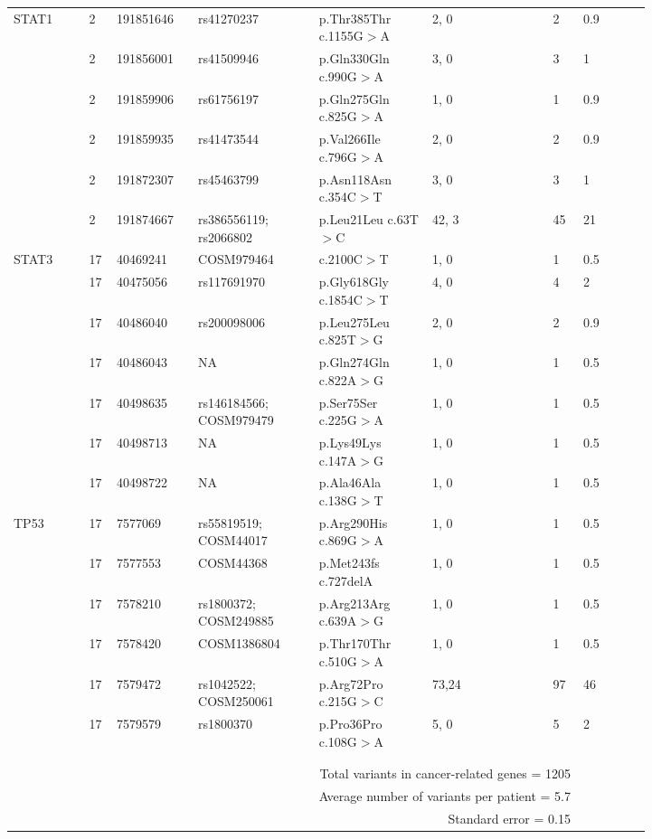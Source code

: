 \begin{longtable}{p{0.1\linewidth}|p{0.02\linewidth}p{0.1\linewidth}p{0.16\linewidth}p{0.15\linewidth}p{0.16\linewidth}p{0.04\linewidth}p{0.09\linewidth}}
		\hline
		STAT1 & 2 & 191851646 & rs41270237 & p.Thr385Thr c.1155G$>$A & 2, 0 & 2 & 0.9
		\\
		& 2 & 191856001 & rs41509946 & p.Gln330Gln c.990G$>$A & 3, 0 & 3 & 1
		\\
		& 2 & 191859906 & rs61756197 & p.Gln275Gln c.825G$>$A & 1, 0 & 1 & 0.9
		\\
		& 2 & 191859935 & rs41473544 & p.Val266Ile c.796G$>$A & 2, 0 & 2 & 0.9
		\\
		& 2 & 191872307 & rs45463799 & p.Asn118Asn c.354C$>$T & 3, 0 & 3 & 1
		\\
		& 2 & 191874667 & rs386556119; rs2066802 & p.Leu21Leu c.63T$>$C & 42, 3 & 45 & 21
		\\
		\hline
		STAT3 & 17 & 40469241 & COSM979464 & c.2100C$>$T & 1, 0 & 1 & 0.5
		\\
		& 17 & 40475056 & rs117691970 & p.Gly618Gly c.1854C$>$T & 4, 0 & 4 & 2
		\\
		& 17 & 40486040 & rs200098006 & p.Leu275Leu c.825T$>$G & 2, 0 & 2 & 0.9
		\\
		& 17 & 40486043 & NA & p.Gln274Gln c.822A$>$G & 1, 0 & 1 & 0.5
		\\
		& 17 & 40498635 & rs146184566; COSM979479 & p.Ser75Ser c.225G$>$A & 1, 0 & 1 & 0.5
		\\
		& 17 & 40498713 & NA & p.Lys49Lys c.147A$>$G & 1, 0 & 1 & 0.5
		\\
		& 17 & 40498722 & NA & p.Ala46Ala c.138G$>$T & 1, 0 & 1 & 0.5
		\\
		\hline
		TP53 & 17 & 7577069 & rs55819519; COSM44017 & p.Arg290His c.869G$>$A & 1, 0 & 1 & 0.5
		\\
		& 17 & 7577553 & COSM44368 & p.Met243fs c.727delA & 1, 0 & 1 & 0.5
		\\
		& 17 & 7578210 & rs1800372; COSM249885 & p.Arg213Arg c.639A$>$G & 1, 0 & 1 & 0.5
		\\
		& 17 & 7578420 & COSM1386804 & p.Thr170Thr c.510G$>$A & 1, 0 & 1 & 0.5
		\\
		& 17 & 7579472 & rs1042522; COSM250061 & p.Arg72Pro c.215G$>$C & 73,24 & 97 & 46
		\\
		& 17 & 7579579 & rs1800370 & p.Pro36Pro c.108G$>$A & 5, 0 & 5 & 2
		\\
		\hline
		\\
    \\
		&
		\multicolumn{6}{r}{Total variants in cancer-related genes = 1205}
		\\
		&
		\multicolumn{6}{r}{Average number of variants per patient = 5.7}
		\\
		&
		\multicolumn{6}{r}{Standard error = 0.15}
		\\
		\hline
\end{longtable}
